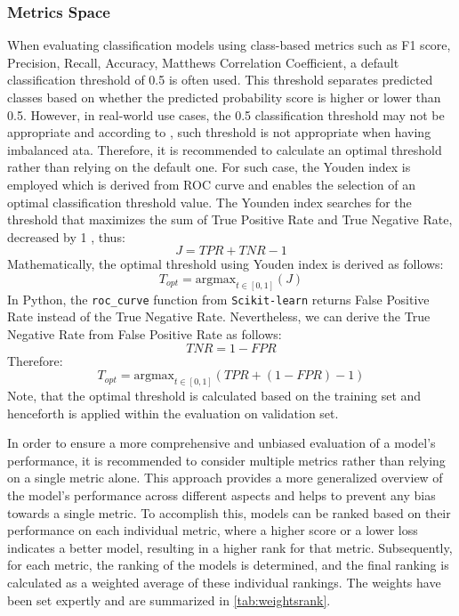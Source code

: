 \subsubsection{Metrics Space}

When evaluating classification models using class-based metrics such as F1 score, Precision, Recall, Accuracy, Matthews Correlation Coefficient, a default classification threshold of 0.5 is often used. This threshold separates predicted classes based on whether the predicted probability score is higher or lower than 0.5.
However, in real-world use cases, the 0.5 classification threshold may not be appropriate and according to \citep{esposito2021ghost}, such threshold is not appropriate when having imbalanced ata. Therefore, it is recommended to calculate an optimal threshold rather than relying on the default one.
For such case, the Youden index is employed which is derived from ROC curve and enables the selection of an optimal classification threshold value. 
The Younden index searches for the threshold that maximizes the sum of True Positive Rate and True Negative Rate, decreased by 1 \citep{fluss2005estimation}, thus:
\begin{equation}\label{eq}
J = TPR + TNR - 1
\end{equation}
Mathematically, the optimal threshold using Youden index is derived as follows:
\begin{equation}\label{eq}
T_{opt} = \text{argmax}_{t \in [0, 1]}\left(J\right)
\end{equation}
In Python, the \lstinline{roc_curve} function from \lstinline{Scikit-learn} returns False Positive Rate instead of the True Negative Rate. Nevertheless, we can derive the True Negative Rate from False Positive Rate as follows:
\begin{equation}\label{eq}
TNR =  1-FPR
\end{equation}
Therefore:
\begin{equation}\label{eq}
T_{opt} = \text{argmax}_{t \in [0, 1]}\left(TPR +  \left(1-FPR\right) - 1\right)
\end{equation}
Note, that the optimal threshold is calculated based on the training set and henceforth is applied within the evaluation on validation set.

In order to ensure a more comprehensive and unbiased evaluation of a model's performance, it is recommended to consider multiple metrics rather than relying on a single metric alone. This approach provides a more generalized overview of the model's performance across different aspects and helps to prevent any bias towards a single metric.
To accomplish this, models can be ranked based on their performance on each individual metric, where a higher score or a lower loss indicates a better model, resulting in a higher rank for that metric. Subsequently, for each metric, the ranking of the models is determined, and the final ranking is calculated as a weighted average of these individual rankings.
The weights have been set expertly and are summarized in \autoref{tab:weightsrank}.

